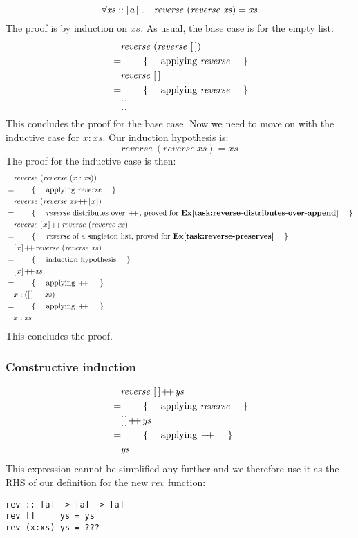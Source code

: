 \begin{displaymath}
\forall \mathit{xs} :: [\mskip1.5mu a \mskip1.5mu]~. \quad \mathit{reverse}~(\mathit{reverse}~\mathit{xs}) = \mathit{xs}
\end{displaymath}
The proof is by induction on $\mathit{xs}$. As usual, the base case is for the empty list:
\begin{align*}
\expr{\mathit{reverse}~(\mathit{reverse}~\hslist{})}
\hint{applying $\mathit{reverse}$}
\expr{\mathit{reverse}~\hslist{}}
\hint{applying $\mathit{reverse}$}
\lastexpr{\hslist{}}
\end{align*}
This concludes the proof for the base case. Now we need to move on with the inductive case for $x : \mathit{xs}$. Our induction hypothesis is:
\begin{displaymath}
\mathit{reverse}~(\mathit{reverse}~\mathit{xs}) = \mathit{xs}
\end{displaymath}
The proof for the inductive case is then:
\begin{align*}
\expr{\mathit{reverse}~(\mathit{reverse}~(x:\mathit{xs}))}
\hint{applying $\mathit{reverse}$}
\expr{\mathit{reverse}~(\mathit{reverse}~\mathit{xs} \append \hslist{x})}
\hint{$\mathit{reverse}$ distributes over $\append$, proved for \textbf{Ex\ref{task:reverse-distributes-over-append}}}
\expr{\mathit{reverse}~\hslist{x} \append \mathit{reverse}~(\mathit{reverse}~\mathit{xs})}
\hint{$\mathit{reverse}$ of a singleton list, proved for \textbf{Ex\ref{task:reverse-preserves}}}
\expr{\hslist{x} \append \mathit{reverse}~(\mathit{reverse}~\mathit{xs})}
\hint{induction hypothesis}
\expr{\hslist{x} \append \mathit{xs}}
\hint{applying $\append$}
\expr{x : (\hslist{} \append \mathit{xs})}
\hint{applying $\append$}
\lastexpr{x : \mathit{xs}}
\end{align*}
This concludes the proof.

\subsubsection{Constructive induction}

\begin{align*}
\expr{\mathit{reverse}~\hslist{} \append \mathit{ys}}
\hint{applying $\mathit{reverse}$}
\expr{\hslist{} \append \mathit{ys}}
\hint{applying $\append$}
\lastexpr{\mathit{ys}}
\end{align*}
This expression cannot be simplified any further and we therefore use it as the RHS of our definition for the new $\mathit{rev}$ function:
\begin{verbatim}
rev :: [a] -> [a] -> [a]
rev []     ys = ys
rev (x:xs) ys = ???
\end{verbatim} 

